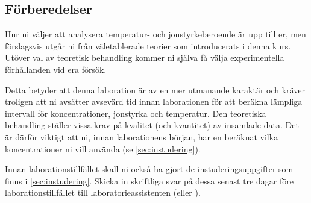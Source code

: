 \subsection{Förberedelser}
Hur ni väljer att analysera temperatur- och jonstyrkeberoende är
upp till er, men förslagsvis utgår ni från väletablerade
teorier som introducerats i denna kurs. Utöver val av teoretisk behandling
kommer ni själva få välja experimentella förhållanden vid era försök.

Detta betyder att denna laboration är av en mer utmanande karaktär och
kräver troligen att ni avsätter avsevärd tid innan laborationen för att
beräkna lämpliga intervall för koncentrationer, jonstyrka och
temperatur. Den teoretiska behandling ställer vissa krav på kvalitet (och
kvantitet) av insamlade data. Det är därför viktigt att ni, innan
laborationens början, har en beräknat vilka koncentrationer ni vill
använda (se \cref{sec:instudering}).

Innan laborationstillfället skall ni också ha gjort de
instuderingsuppgifter som finns i \cref{sec:instudering}. Skicka in
skriftliga svar på dessa senast tre dagar före laborationstillfället till
laboratorieassistenten (\mailtobjorn eller \mailtocamilla).

